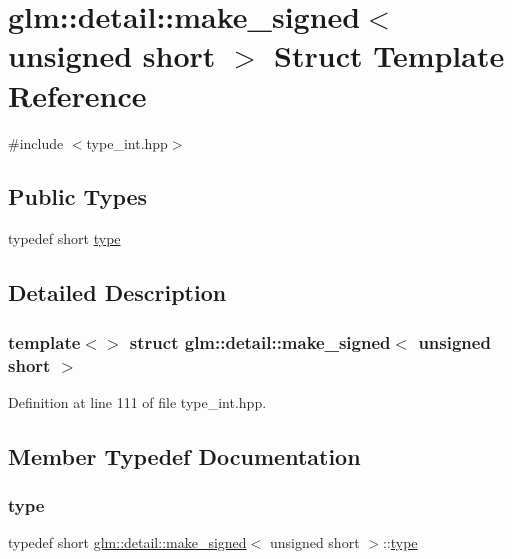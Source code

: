 \hypertarget{structglm_1_1detail_1_1make__signed_3_01unsigned_01short_01_4}{}\section{glm\+::detail\+::make\+\_\+signed$<$ unsigned short $>$ Struct Template Reference}
\label{structglm_1_1detail_1_1make__signed_3_01unsigned_01short_01_4}


{\ttfamily \#include $<$type\+\_\+int.\+hpp$>$}

\subsection*{Public Types}
\begin{DoxyCompactItemize}
\item 
typedef short \mbox{\hyperlink{structglm_1_1detail_1_1make__signed_3_01unsigned_01short_01_4_af5793ac48501a8fb2be1d5aa55afff67}{type}}
\end{DoxyCompactItemize}


\subsection{Detailed Description}
\subsubsection*{template$<$$>$\newline
struct glm\+::detail\+::make\+\_\+signed$<$ unsigned short $>$}



Definition at line 111 of file type\+\_\+int.\+hpp.



\subsection{Member Typedef Documentation}
\mbox{\label{structglm_1_1detail_1_1make__signed_3_01unsigned_01short_01_4_af5793ac48501a8fb2be1d5aa55afff67}} 
\subsubsection{\texorpdfstring{type}{type}}
{\footnotesize\ttfamily typedef short \mbox{\hyperlink{structglm_1_1detail_1_1make__signed}{glm\+::detail\+::make\+\_\+signed}}$<$ unsigned short $>$\+::\mbox{\hyperlink{structglm_1_1detail_1_1make__signed_3_01unsigned_01short_01_4_af5793ac48501a8fb2be1d5aa55afff67}{type}}}



